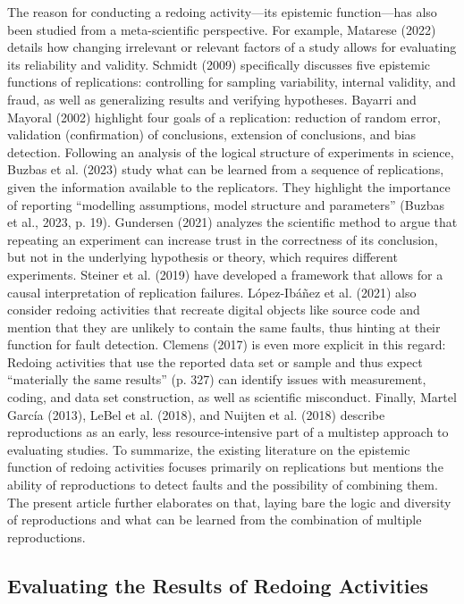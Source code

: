 \documentclass[authordate, meta]{jote-new-article}
\begin{document}
	The reason for conducting a redoing activity—its epistemic function—has also been studied from a meta-scientific perspective. For example, Matarese (2022) details how changing irrelevant or relevant factors of a study allows for evaluating its reliability and validity. Schmidt (2009) specifically discusses five epistemic functions of replications: controlling for sampling variability, internal validity, and fraud, as well as generalizing results and verifying hypotheses. Bayarri and Mayoral (2002) highlight four goals of a replication: reduction of random error, validation (confirmation) of conclusions, extension of conclusions, and bias detection. Following an analysis of the logical structure of experiments in science, Buzbas et al. (2023) study what can be learned from a sequence of replications, given the information available to the replicators. They highlight the importance of reporting “modelling assumptions, model structure and parameters” (Buzbas et al., 2023, p. 19). Gundersen (2021) analyzes the scientific method to argue that repeating an experiment can increase trust in the correctness of its conclusion, but not in the underlying hypothesis or theory, which requires different experiments. Steiner et al. (2019) have developed a framework that allows for a causal interpretation of replication failures. López-Ibáñez et al. (2021) also consider redoing activities that recreate digital objects like source code and mention that they are unlikely to contain the same faults, thus hinting at their function for fault detection. Clemens (2017) is even more explicit in this regard: Redoing activities that use the reported data set or sample and thus expect “materially the same results” (p. 327) can identify issues with measurement, coding, and data set construction, as well as scientific misconduct. Finally, Martel García (2013), LeBel et al. (2018), and Nuijten et al. (2018) describe reproductions as an early, less resource-intensive part of a multistep approach to evaluating studies. To summarize, the existing literature on the epistemic function of redoing activities focuses primarily on replications but mentions the ability of reproductions to detect faults and the possibility of combining them. The present article further elaborates on that, laying bare the logic and diversity of reproductions and what can be learned from the combination of multiple reproductions.



	\subsection{Evaluating the Results of Redoing Activities}
\end{document}
